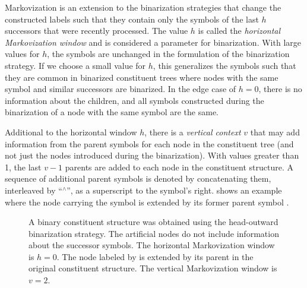 \documentclass[../../document.tex]{subfiles}
\begin{document}
    Markovization is an extension to the binarization strategies that change the constructed labels such that they contain only the symbols of the last \(h\) successors that were recently processed.
    The value \(h\) is called the \emph{horizontal Markovization window} and is considered a parameter for binarization.
    With large values for \(h\), the symbols are unchanged in the formulation of the binarization strategy.
    If we choose a small value for \(h\), this generalizes the symbols such that they are common in binarized constituent trees where nodes with the same symbol and similar successors are binarized.
    In the edge case of \(h=0\), there is no information about the children, and all symbols constructed during the binarization of a node with the same symbol are the same.

    Additional to the horizontal window \(h\), there is a \emph{vertical context} \(v\) that may add information from the parent symbols for each node in the constituent tree (and not just the nodes introduced during the binarization).
    With values greater than 1, the last \(v-1\) parents are added to each node in the constituent structure.
    A sequence of additional parent symbols is denoted by concatenating them, interleaved by ``$^\wedge$'', as a superscript to the symbol's right.
     shows an example where the node carrying the symbol  is extended by its former parent symbol .

    \begin{figure}
        \centering
        
        \caption{\label{fig:ex:markovization}
            A binary constituent structure was obtained using the head-outward binarization strategy.
            The artificial nodes do not include information about the successor symbols. The horizontal Markovization window is \(h = 0\).
            The node labeled by \label{np} is extended by its parent in the original constituent structure. The vertical Markovization window is \(v = 2\).}
    \end{figure}
\end{document}
